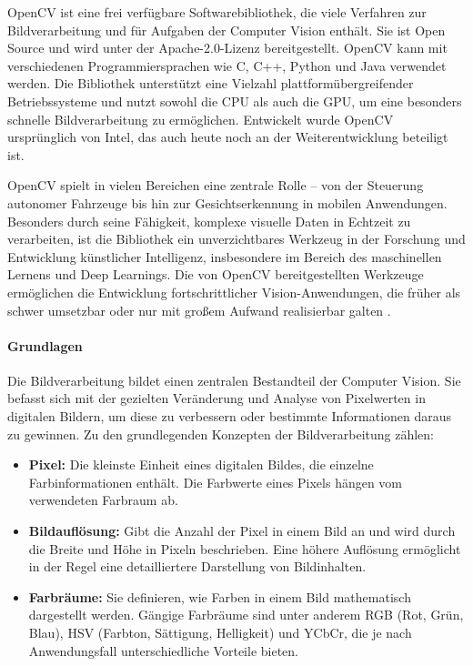 OpenCV ist eine frei verfügbare Softwarebibliothek, die viele Verfahren zur Bildverarbeitung und für Aufgaben der Computer Vision enthält. Sie ist Open Source und wird unter der Apache-2.0-Lizenz bereitgestellt. OpenCV kann mit verschiedenen Programmiersprachen wie C, C++, Python und Java verwendet werden. Die Bibliothek unterstützt eine Vielzahl plattformübergreifender Betriebssysteme und nutzt sowohl die CPU als auch die GPU, um eine besonders schnelle Bildverarbeitung zu ermöglichen. Entwickelt wurde OpenCV ursprünglich von Intel, das auch heute noch an der Weiterentwicklung beteiligt ist.

OpenCV spielt in vielen Bereichen eine zentrale Rolle – von der Steuerung autonomer Fahrzeuge bis hin zur Gesichtserkennung in mobilen Anwendungen. Besonders durch seine Fähigkeit, komplexe visuelle Daten in Echtzeit zu verarbeiten, ist die Bibliothek ein unverzichtbares Werkzeug in der Forschung und Entwicklung künstlicher Intelligenz, insbesondere im Bereich des maschinellen Lernens und Deep Learnings. Die von OpenCV bereitgestellten Werkzeuge ermöglichen die Entwicklung fortschrittlicher Vision-Anwendungen, die früher als schwer umsetzbar oder nur mit großem Aufwand realisierbar galten \cite{ultralytics_cv_2025}.

\paragraph{Grundlagen}
Die Bildverarbeitung bildet einen zentralen Bestandteil der Computer Vision. Sie befasst sich mit der gezielten Veränderung und Analyse von Pixelwerten in digitalen Bildern, um diese zu verbessern oder bestimmte Informationen daraus zu gewinnen. Zu den grundlegenden Konzepten der Bildverarbeitung zählen:

\begin{itemize}
    \item \textbf{Pixel:} Die kleinste Einheit eines digitalen Bildes, die einzelne Farbinformationen enthält. Die Farbwerte eines Pixels hängen vom verwendeten Farbraum ab.
    \item \textbf{Bildauflösung:} Gibt die Anzahl der Pixel in einem Bild an und wird durch die Breite und Höhe in Pixeln beschrieben. Eine höhere Auflösung ermöglicht in der Regel eine detailliertere Darstellung von Bildinhalten.
    \item \textbf{Farbräume:} Sie definieren, wie Farben in einem Bild mathematisch dargestellt werden. Gängige Farbräume sind unter anderem RGB (Rot, Grün, Blau), HSV (Farbton, Sättigung, Helligkeit) und YCbCr, die je nach Anwendungsfall unterschiedliche Vorteile bieten.
\end{itemize}

